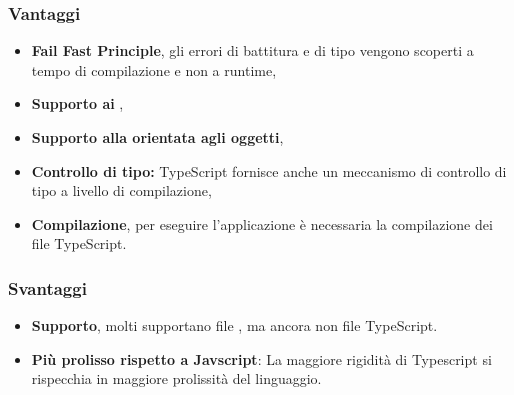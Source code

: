 \subsubsection{Vantaggi}
\begin{itemize}
\item \textbf{Fail Fast Principle}, gli errori di battitura e di tipo vengono scoperti a tempo di compilazione e non a runtime,
\item \textbf{Supporto ai },
\item \textbf{Supporto alla  orientata agli oggetti},
\item \textbf{Controllo di tipo:} TypeScript fornisce anche un meccanismo di controllo di tipo a livello di compilazione,
\item \textbf{Compilazione}, per eseguire l'applicazione \`e necessaria la compilazione dei file TypeScript.
\end{itemize}
\subsubsection{Svantaggi}
\begin{itemize}
\item \textbf{Supporto}, molti  supportano file , ma ancora non file TypeScript.
\item \textbf{Più prolisso rispetto a Javscript}: La maggiore rigidità di Typescript si rispecchia in maggiore prolissità del linguaggio.
\end{itemize}

